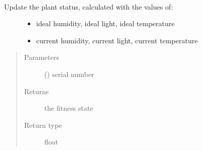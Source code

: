 \documentclass[letterpaper,10pt,english]{sphinxmanual}
\begin{document}

\begin{fulllineitems}
\label{\detokenize{index:controller.utility.update_plant_state_fitness}}~\begin{description}
\item[{Update the plant status, calculated with the values of:}] \leavevmode\begin{itemize}
\item {} 
ideal humidity, ideal light, ideal temperature

\item {} 
current humidity, current light, current temperature

\end{itemize}

\end{description}
\begin{quote}\begin{description}
\item[{Parameters}] \leavevmode
{} () \textendash{} serial number

\item[{Returns}] \leavevmode
the fitness state

\item[{Return type}] \leavevmode
float

\end{description}\end{quote}

\end{fulllineitems}

\end{document}
